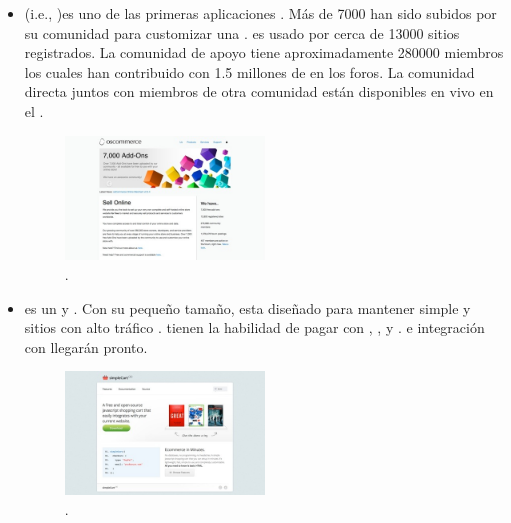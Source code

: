 \begin{itemize}
	\item \textbf{\nameOsCommerce} (i.e., \openSourcePC \commerce)es uno de las primeras aplicaciones \ecommerce \openSourcePC. Más de 7000 \freePC \addOns han sido subidos por su comunidad para customizar una \store \online. \nameOsCommerce es usado por cerca de 13000 sitios registrados. La comunidad de apoyo tiene aproximadamente 280000 miembros los cuales han contribuido con 1.5 millones de \posts en los foros. La comunidad directa juntos con miembros de otra comunidad están disponibles en vivo en el \chat \room.

	\begin{figure}[H]
		\centering
		\includegraphics[width=0.5\textwidth]{figuras/cap1/osCommerceWebsite.jpg}
		\caption{\nameOsCommerce \websiteINT \cite{online_osCommerce}.}
	\end{figure}

	\item \textbf{\nameSimpleCart} es un \freePC y \openSourcePC \javaScriptNAME \shoppingCart. Con su pequeño tamaño, \nameSimpleCart esta diseñado para mantener simple  y sitios con alto tráfico \runningCPT \fast. \nameSimpleCart tienen la habilidad de pagar con \paypalCheckout, \googleCheckout, y \amazonPayments. \email \checkoutCOM e integración con \AuthorizeNet llegarán pronto.
	
	\begin{figure}[H]
		\centering
		\includegraphics[width=0.5\textwidth]{figuras/cap1/simpleCartWebsite.jpg}
		\caption{\nameSimpleCart \websiteINT \cite{online_simpleCart}.}
	\end{figure}


\end{itemize}
